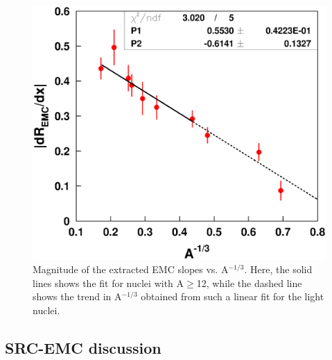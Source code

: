 \begin{figure}[htbp]
\begin{center}
\includegraphics[width=.38\textwidth]{plots/emcslopes_athird.eps}
\caption{Magnitude of the extracted EMC slopes vs. A$^{-1/3}$. Here, the solid
lines shows the fit for nuclei with A$\geq$12, while the dashed line shows the
trend in A$^{-1/3}$ obtained from such a linear fit for the light
nuclei.\label{emcslopes_athird_fig}}
\end{center}
\end{figure}
\subsection{SRC-EMC discussion}

